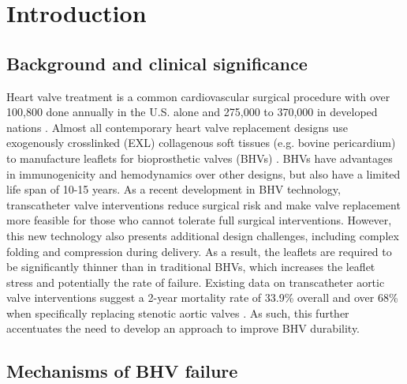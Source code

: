 

\section{Introduction}


\subsection{Background and clinical significance}

	Heart valve treatment is a common cardiovascular surgical procedure with over 100,800 done annually in the U.S. alone \cite{mozaffarian_heart_2015} and 275,000 to 370,000 in developed nations \cite{manji_future_2012}. Almost all contemporary heart valve replacement designs use exogenously crosslinked (EXL) collagenous soft tissues (e.g. bovine pericardium) to manufacture leaflets for bioprosthetic valves (BHVs) \cite{starr_artificial_2007, soares_biomechanical_2016}. BHVs have advantages in immunogenicity and hemodynamics over other designs, but also have a limited life span of 10-15 years. As a recent development in BHV technology, transcatheter valve interventions \cite{bonow_accaha_2006, guidoin_marvel_2010} reduce surgical risk and make valve replacement more feasible for those who cannot tolerate full surgical interventions. However, this new technology also presents additional design challenges, including complex folding and compression during delivery. As a result, the leaflets are required to be significantly thinner than in traditional BHVs, which increases the leaflet stress and potentially the rate of failure. Existing data on transcatheter aortic valve interventions suggest a 2-year mortality rate of 33.9\% overall \cite{mozaffarian_heart_2015} and over 68\% when specifically replacing stenotic aortic valves \cite{makkar_transcatheter_2012}. As such, this further accentuates the need to develop an approach to improve BHV durability. 
	
	 
\subsection{Mechanisms of BHV failure}

